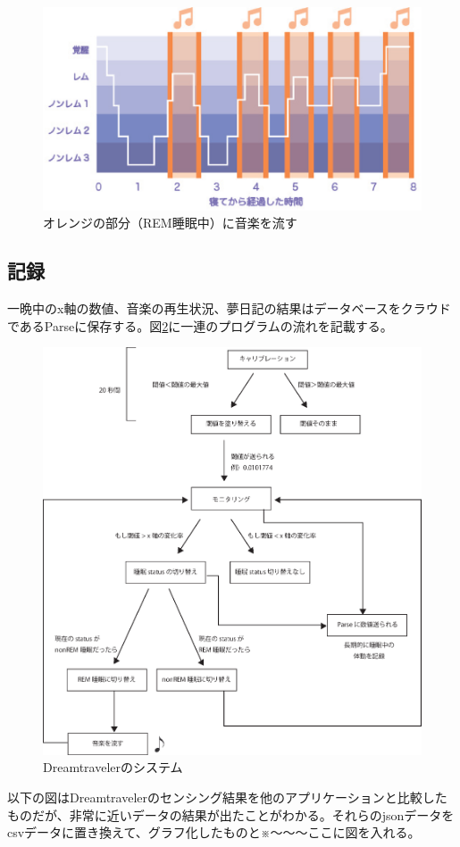 \begin{figure}[htbp]
\begin{center}
\includegraphics[width=15cm]{eps/remNonrem.eps}
\caption{オレンジの部分（REM睡眠中）に音楽を流す}
\label{melodyGraph}
\end{center}
\end{figure}


\subsection{記録}
一晩中のx軸の数値、音楽の再生状況、夢日記の結果はデータベースをクラウドであるParseに保存する。図\ref{system}に一連のプログラムの流れを記載する。

\begin{figure}[htbp]
\begin{center}
\includegraphics[width=12cm]{eps/system.eps}
\caption{Dreamtravelerのシステム}
\label{system}
\end{center}
\end{figure}

以下の図はDreamtravelerのセンシング結果を他のアプリケーションと比較したものだが、非常に近いデータの結果が出たことがわかる。それらのjsonデータをcsvデータに置き換えて、グラフ化したものと※〜〜〜ここに図を入れる。

